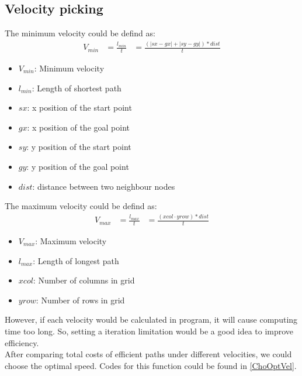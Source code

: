 \subsection{Velocity picking}
\label{Effective velocity}
The minimum velocity could be defind as:
\begin{equation}
    \begin{aligned}
        V_{min}&=\frac{l_{min}}{t}
        &=\frac{(|sx-gx|+|sy-gy|)*dist}{t}
    \end{aligned}
\end{equation}
\begin{itemize}
    \item $V_{min}$: Minimum velocity
    \item $l_{min}$: Length of shortest path
    \item $sx$: x position of the start point
    \item $gx$: x position of the goal point
    \item $sy$: y position of the start point
    \item $gy$: y position of the goal point
    \item $dist$: distance between two neighbour nodes
\end{itemize}
The maximum velocity could be defind as:
\begin{equation}
    \begin{aligned}
        V_{max}&=\frac{l_{max}}{t}
        &=\frac{(xcol \cdot yrow)*dist}{t}
    \end{aligned}
\end{equation}
\begin{itemize}
    \item $V_{max}$: Maximum velocity
    \item $l_{max}$: Length of longest path
    \item $xcol$: Number of columns in grid
    \item $yrow$: Number of rows in grid 
\end{itemize}
However, if each velocity would be calculated in program, it will cause computing time too long. So, setting a iteration limitation would be a good idea to improve efficiency.
\\After comparing total costs of efficient paths under different velocities, we could choose the optimal speed. Codes for this function could be found in \autoref{ChoOptVel}.